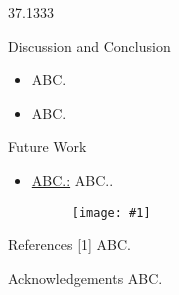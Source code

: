 \documentclass[t]{beamer}
\newcommand{\n}{\par \smallskip}
\newcommand{\imgnobox}[2]{\begin{figure}[htp]\texttt{[image: \#1]}\end{figure}}
\newcommand{\colwidth}{37.1333}
\begin{document}
{\begin{textblock}{\colwidth}
\begin{frame}
  \begin{block}{Discussion and Conclusion}
  \begin{itemize}
  \item ABC.
  \item ABC.
  \end{itemize}
  \end{block} 
  
  \begin{block}{Future Work}
  \begin{itemize}
  \item \underline{ABC.:} ABC..
  \imgnobox{todo.png}{0.8}
  \end{itemize}
  \end{block} 
  
  \begin{block}{References}
  [1] ABC. \n
  \end{block} 
  
  \begin{block}{Acknowledgements}
  ABC.
  \end{block}
  \end{frame}
\end{textblock}
}
  
\end{document}

